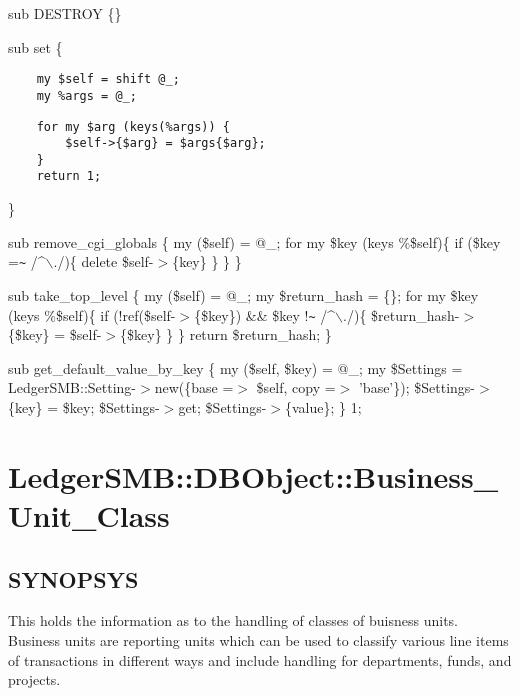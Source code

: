 sub DESTROY \{\}



sub set \{

\begin{verbatim}
    my $self = shift @_;
    my %args = @_;
\end{verbatim}
\begin{verbatim}
    for my $arg (keys(%args)) {
        $self->{$arg} = $args{$arg};
    }
    return 1;
\end{verbatim}


\}



sub remove\_cgi\_globals \{
    my (\$self) = @\_;
    for my \$key (keys \%\$self)\{
        if (\$key =\texttt{\~{}} /\^{}$\backslash$./)\{
            delete \$self-$>$\{key\}
        \}
    \}
\}



sub take\_top\_level \{
   my (\$self) = @\_;
   my \$return\_hash = \{\};
   for my \$key (keys \%\$self)\{
       if (!ref(\$self-$>$\{\$key\}) \&\& \$key !\texttt{\~{}} /\^{}$\backslash$./)\{
          \$return\_hash-$>$\{\$key\} = \$self-$>$\{\$key\}
       \}
   \}
   return \$return\_hash;
\}



sub get\_default\_value\_by\_key 
\{
    my (\$self, \$key) = @\_;
    my \$Settings = LedgerSMB::Setting-$>$new(\{base =$>$ \$self, copy =$>$ 'base'\});
    \$Settings-$>$\{key\} = \$key;
    \$Settings-$>$get;    
    \$Settings-$>$\{value\};    
\}
1;

\section{LedgerSMB::DBObject::Business\_Unit\_Class\label{LedgerSMB::DBObject::Business_Unit_Class}}




\subsection*{SYNOPSYS\label{LedgerSMB::DBObject::Business_Unit_Class_SYNOPSYS}}


This holds the information as to the handling of classes of buisness units.  
Business units are reporting units which can be used to classify various line 
items of transactions in different ways and include handling for departments, 
funds, and projects.

